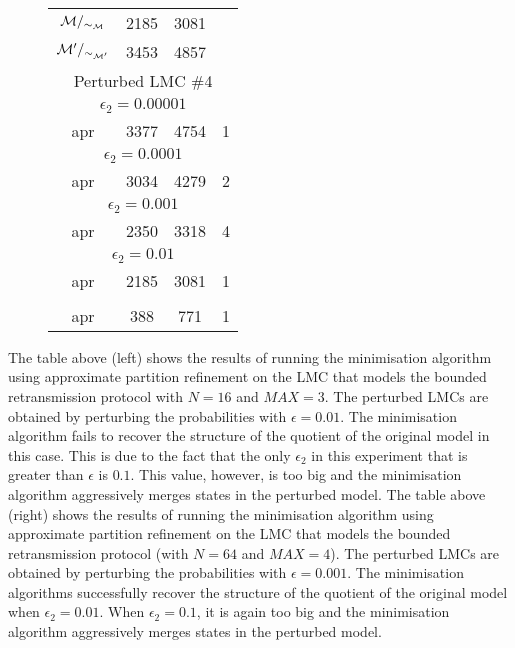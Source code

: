 \begin{figure}[h!]
\begin{floatrow}
{\begin{tabular}{|c|c|c|c|}
				$\mathcal{M}/_{\sim_{\mathcal{M}}}$	&		 		2185	&  3081	  		&\\								
				$\mathcal{M}'/_{\sim_{\mathcal{M}'}}$     & 		3453	& 4857      & \\
				\hline
				\multicolumn{4}{|c|}{Perturbed LMC \#4}\\ 
				\hline
				\multicolumn{4}{|c|}{$\epsilon_2 = 0.00001$}\\
				\hline
				apr		&  3377 &	4754 &	1\\
				\hline
				\multicolumn{4}{|c|}{$\epsilon_2 = 0.0001$}\\
				\hline
				apr		&  3034 &	4279&	2\\
				\hline			
				\multicolumn{4}{|c|}{$\epsilon_2 =  0.001$}\\
				\hline
				apr		 &  2350 &	3318&	4 \\
				\hline
				\multicolumn{4}{|c|}{$\epsilon_2 =  0.01$}\\
				\hline
				\rowcolor{yellow}
				apr		 &  2185 &	3081 &	1 \\
				\rowcolor{white}
				\hline			
				\multicolumn{4}{|c|}{$\epsilon_2 = 0.1$}\\
				\hline
				\rowcolor{red!40}
				apr		 &  388	&771&	1\\
				\hline
			\end{tabular}	
		}{}
	\end{floatrow}
\end{figure}

The table above (left) shows the results of running the minimisation algorithm using approximate partition refinement on the LMC that models the bounded retransmission protocol with $N =16$ and $\mathit{MAX} = 3$. The perturbed LMCs are obtained by perturbing the probabilities with $\epsilon = 0.01$. The minimisation algorithm fails to recover the structure of the quotient of the original model in this case. This is due to the fact that the only $\epsilon_2$ in this experiment that is greater than $\epsilon$ is $0.1$. This value, however, is too big and the minimisation algorithm aggressively merges states in the perturbed model.  The table above (right) shows the results of running the minimisation algorithm using approximate partition refinement on the LMC that models the bounded retransmission protocol (with $N =64$ and $\mathit{MAX} = 4$). The perturbed LMCs are obtained by perturbing the probabilities with $\epsilon = 0.001$. The minimisation algorithms successfully recover the structure of the quotient of the original model when $\epsilon_2 = 0.01$. When $\epsilon_2 = 0.1$, it is again too big and the minimisation algorithm aggressively merges states in the perturbed model.


